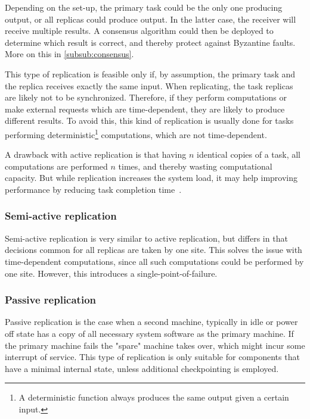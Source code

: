 \documentclass{cslthse-msc}
\begin{document}
Depending on the set-up, the primary task could be the only one producing output, or all replicas could produce output. In the latter case, the receiver will receive multiple results. A consensus algorithm could then be deployed to determine which result is correct, and thereby protect against Byzantine faults. More on this in \cref{subsub:consensus}.

This type of replication is feasible only if, by assumption, the primary task and the replica receives exactly the same input. When replicating, the task replicas are likely not to be synchronized. Therefore, if they perform computations or make external requests which are time-dependent, they are likely to produce different results. To avoid this, this kind of replication is usually done for tasks performing deterministic\footnote{A deterministic function always produces the same output given a certain input.} computations, which are not time-dependent.

A drawback with active replication is that having $n$ identical copies of a task, all computations are performed $n$ times, and thereby wasting computational capacity. But while replication increases the system load, it may help improving performance by reducing task completion time~\cite{improvingPerformanceReplication}.

\subsubsection{Semi-active replication} \label{subsec:semi_active_replication}
Semi-active replication is very similar to active replication, but differs in that decisions common for all replicas are taken by one site. This solves the issue with time-dependent computations, since all such computations could be performed by one site. However, this introduces a single-point-of-failure. %

\subsubsection{Passive replication} \label{subsec:passive_replication}
Passive replication is the case when a second machine, typically in idle or power off state has a copy of all necessary system software as the primary machine. If the primary machine fails the "spare" machine takes over, which might incur some interrupt of service. This type of replication is only suitable for components that have a minimal internal state, unless additional checkpointing is employed.
\end{document}

